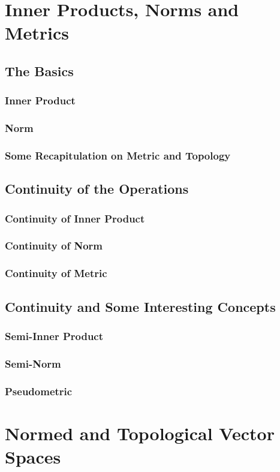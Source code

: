 \chapter{Inner Products, Norms and Metrics}
\section{The Basics}
\subsection{Inner Product}
\subsection{Norm}
\subsection{Some Recapitulation on Metric and Topology}
\section{Continuity of the Operations}
\subsection{Continuity of Inner Product}
\subsection{Continuity of Norm}
\subsection{Continuity of Metric}
\section{Continuity and Some Interesting Concepts}
\subsection{Semi-Inner Product}
\subsection{Semi-Norm}
\subsection{Pseudometric}
\chapter{Normed and Topological Vector Spaces}
